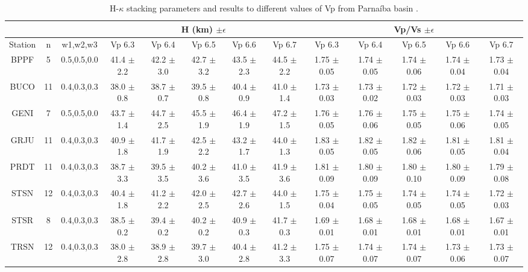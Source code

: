 \documentclass[manuscript,11pt]{geophysics}
\begin{document}
\begin{landscape}
\begin{table}[! htpb]
\centering

\small
	\begin{threeparttable}
\caption{H-$\kappa$ stacking parameters and results to different values of Vp from Parnaíba basin .}
\label{tabela_hk_stacking}
\begin{tabular}{ccc|ccccc|ccccc}
 &  & & \multicolumn{5}{|c|}{H (km) $\pm \epsilon$} & \multicolumn{5}{|c|}{Vp/Vs $\pm \epsilon$} \\ \hline
Station & n & w1,w2,w3 & Vp 6.3 & Vp 6.4 & Vp 6.5 & Vp 6.6 & Vp 6.7 & Vp 6.3 & Vp 6.4 & Vp 6.5 & Vp 6.6 & Vp 6.7 \\ \hline
BPPF & 5 & 0.5,0.5,0.0 & 41.4 $\pm$ 2.2 & 42.2 $\pm$ 3.0 & 42.7 $\pm$ 3.2 & 43.5 $\pm$ 2.3 & 44.5 $\pm$ 2.2 & 1.75 $\pm$ 0.05 & 1.74 $\pm$ 0.05 & 1.74 $\pm$ 0.06 & 1.74 $\pm$ 0.04 & 1.73 $\pm$ 0.04 \\
BUCO & 11 & 0.4,0.3,0.3 & 38.0 $\pm$ 0.8 & 38.7 $\pm$ 0.7 & 39.5 $\pm$ 0.8 & 40.4 $\pm$ 0.9 & 41.0 $\pm$ 1.4 & 1.73 $\pm$ 0.03 & 1.73 $\pm$ 0.02 & 1.72 $\pm$ 0.03  & 1.72 $\pm$ 0.03 & 1.71 $\pm$ 0.03\\
GENI & 7 & 0.5,0.5,0.0 & 43.7 $\pm$ 1.4 & 44.7 $\pm$ 2.5 & 45.5 $\pm$ 1.9 & 46.4 $\pm$ 1.9 & 47.2 $\pm$ 1.5 & 1.76 $\pm$ 0.05 & 1.76 $\pm$ 0.06 & 1.75 $\pm$ 0.05 & 1.75 $\pm$ 0.06 & 1.74 $\pm$ 0.05  \\
GRJU & 11 & 0.4,0.3,0.3 & 40.9 $\pm$ 1.8 & 41.7 $\pm$ 1.9 & 42.5 $\pm$ 2.2 & 43.2 $\pm$ 1.7 & 44.0 $\pm$ 1.3  & 1.83 $\pm$ 0.05 & 1.82 $\pm$ 0.05 & 1.82 $\pm$ 0.06 & 1.81 $\pm$ 0.05 & 1.81 $\pm$ 0.04 \\
PRDT & 11 & 0.4,0.3,0.3 & 38.7 $\pm$ 3.3 & 39.5 $\pm$ 3.5 & 40.2 $\pm$ 3.6 & 41.0 $\pm$ 3.5 & 41.9 $\pm$ 3.6 & 1.81 $\pm$ 0.09 & 1.80 $\pm$ 0.09 & 1.80 $\pm$ 0.10 & 1.80 $\pm$ 0.09 & 1.79 $\pm$ 0.08 \\
STSN & 12 & 0.4,0.3,0.3 & 40.4 $\pm$ 1.8 & 41.2 $\pm$ 2.2 & 42.0 $\pm$ 2.5 & 42.7 $\pm$ 2.6 & 44.0 $\pm$ 1.5  & 1.75 $\pm$ 0.04 & 1.75 $\pm$ 0.05 & 1.74 $\pm$ 0.05 & 1.74 $\pm$ 0.05 & 1.72 $\pm$ 0.03  \\
STSR & 8 & 0.4,0.3,0.3 & 38.5 $\pm$ 0.2 & 39.4 $\pm$ 0.2 & 40.2 $\pm$ 0.2 & 40.9 $\pm$ 0.3 & 41.7 $\pm$ 0.3 & 1.69 $\pm$ 0.01 & 1.68 $\pm$ 0.01 & 1.68 $\pm$ 0.01 & 1.68 $\pm$ 0.01 & 1.67 $\pm$ 0.01 \\
TRSN & 12 & 0.4,0.3,0.3 & 38.0 $\pm$ 2.8 & 38.9 $\pm$ 2.8 & 39.7 $\pm$ 3.0 & 40.4 $\pm$ 2.8 & 41.2 $\pm$ 3.3  & 1.75 $\pm$ 0.07 & 1.74 $\pm$ 0.07 & 1.74 $\pm$ 0.07 & 1.73 $\pm$ 0.06 & 1.73 $\pm$ 0.07 \\

\end{tabular}
\end{threeparttable}
\end{table}
\end{landscape}
\end{document}
